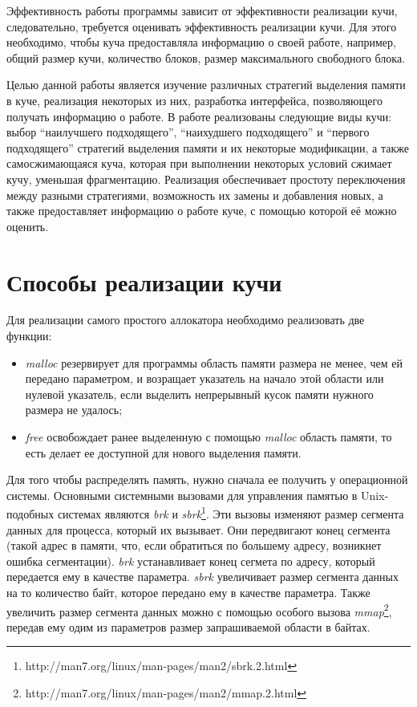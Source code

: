 Эффективность работы программы зависит от эффективности реализации кучи, следовательно, требуется оценивать эффективность реализации кучи. Для этого необходимо, чтобы куча предоставляла информацию о своей работе, например, общий размер кучи, количество блоков, размер максимального свободного блока.

Целью данной работы является изучение различных стратегий выделения памяти в куче, реализация некоторых из них, разработка интерфейса, позволяющего получать информацию о работе. В работе реализованы следующие виды кучи: выбор ``наилучшего подходящего'', ``наихудшего подходящего'' и ``первого подходящего'' стратегий выделения памяти и их некоторые модификации, а также самосжимающаяся куча, которая при выполнении некоторых условий сжимает кучу, уменьшая фрагментацию. Реализация обеспечивает простоту переключения между разными стратегиями, возможность  их замены и добавления новых, а также предоставляет информацию о работе куче, с помощью которой её можно оценить.


\section{Способы реализации кучи}
Для реализации самого простого аллокатора необходимо реализовать две функции:
\begin{itemize}
\item
\textit{malloc} резервирует для программы область памяти размера не менее, чем
ей передано параметром, и возращает указатель на начало этой области или нулевой указатель,
если выделить непрерывный кусок памяти нужного размера не удалось;
\item
\textit{free} освобождает ранее выделенную с помощью \textit{malloc} область памяти, то есть делает ее доступной для нового выделения памяти.
\end{itemize}
Для того чтобы распределять память, нужно сначала ее получить у операционной системы.  
Основными системными вызовами для управления памятью в
Unix-подобных системах являются \textit{brk} и \textit{sbrk}\footnote{http://man7.org/linux/man-pages/man2/sbrk.2.html}.
Эти вызовы изменяют размер сегмента данных для процесса, который их вызывает. Они
передвигают конец сегмента (такой адрес в памяти, что, если обратиться по большему
адресу, возникнет ошибка сегментации). \textit{brk} устанавливает конец сегмета по адресу,
который передается ему в качестве параметра. \textit{sbrk} увеличивает размер
сегмента данных на то количество байт, которое передано ему в качестве параметра. 
Также увеличить размер сегмента данных можно с помощью особого вызова 
\textit{mmap}\footnote{http://man7.org/linux/man-pages/man2/mmap.2.html},
передав ему одим из параметров размер запрашиваемой области в байтах.

